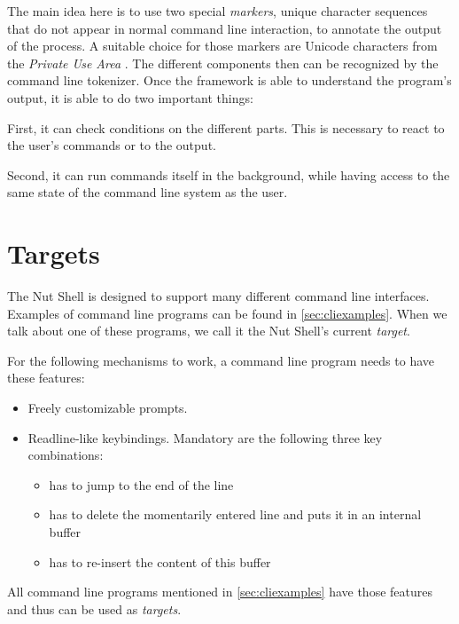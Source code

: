 \documentclass[paper=a4,twoside,abstract=on,cleardoublepage=empty,numbers=noenddot,toc=bib,12pt,appendixprefix=true]{scrreprt}
\begin{document}
The main idea here is to use two special \emph{markers}, unique character sequences that do not appear in normal command line interaction, to annotate the output of the process. A suitable choice for those markers are Unicode characters from the \emph{Private Use Area} \cite[p. 558]{unicode6.2}. The different components then can be recognized by the command line tokenizer. Once the framework is able to understand the program's output, it is able to do two important things:

First, it can check conditions on the different parts. This is necessary to react to the user's commands or to the output.

Second, it can run commands itself in the background, while having access to the same state of the command line system as the user.

\section{Targets}
\label{sec:targets}

The Nut Shell is designed to support many different command line interfaces. Examples of command line programs can be found in \cref{sec:cliexamples}. When we talk about one of these programs, we call it the Nut Shell's current \emph{target}.

For the following mechanisms to work, a command line program needs to have these features:

\begin{itemize}
    \item Freely customizable prompts.
    \item Readline-like keybindings. Mandatory are the following three key combinations:
        \begin{itemize}
            \item {} has to jump to the end of the line

            \item {} has to delete the momentarily entered line and puts it in an internal buffer
            
            \item {} has to re-insert the content of this buffer
        \end{itemize}
\end{itemize}

All command line programs mentioned in \cref{sec:cliexamples} have those features and thus can be used as \emph{targets}.
\end{document}
